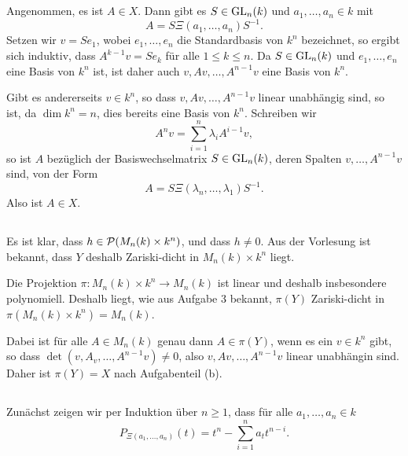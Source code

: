 \documentclass[a4paper,10pt]{article}
\begin{document}
\addtocounter{subsection}{1}
\subsection{}
Angenommen, es ist $A \in X$. Dann gibt es $S \in \operatorname{GL}_n(k)$ und $a_1, \ldots, a_n \in k$ mit
\[
 A = S \Xi(a_1, \ldots, a_n) S^{-1}.
\]
Setzen wir $v = Se_1$, wobei $e_1, \ldots, e_n$ die Standardbasis von $k^n$ bezeichnet, so ergibt sich induktiv, dass $A^{k-1} v = S e_k$ für alle $1 \leq k \leq n$. Da $S \in \operatorname{GL}_n(k)$ und $e_1, \ldots, e_n$ eine Basis von $k^n$ ist, ist daher auch $v, Av, \ldots, A^{n-1}v$ eine Basis von $k^n$.

Gibt es andererseits $v \in k^n$, so dass $v, Av, \ldots, A^{n-1}v$ linear unabhängig sind, so ist, da $\dim k^n = n$, dies bereits eine Basis von $k^n$. Schreiben wir
\[
 A^n v = \sum_{i=1}^n \lambda_i A^{i-1}v,
\]
so ist $A$ bezüglich der Basiswechselmatrix $S \in \operatorname{GL}_n(k)$, deren Spalten $v, \ldots, A^{n-1}v$ sind, von der Form
\[
 A = S \Xi(\lambda_n, \ldots, \lambda_1) S^{-1}.
\]
Also ist $A \in X$.


\subsection{}
Es ist klar, dass $h \in \mathcal{P}(M_n(k) \times k^n)$, und dass $h \neq 0$. Aus der Vorlesung ist bekannt, dass $Y$ deshalb Zariski-dicht in $M_n(k) \times k^n$ liegt.

Die Projektion $\pi : M_n(k) \times k^n \to M_n(k)$ ist linear und deshalb insbesondere polynomiell. Deshalb liegt, wie aus Aufgabe 3 bekannt, $\pi(Y)$ Zariski-dicht in $\pi(M_n(k) \times k^n) = M_n(k)$.

Dabei ist für alle $A \in M_n(k)$ genau dann $A \in \pi(Y)$, wenn es ein $v \in k^n$ gibt, so dass $\det(v, A_v, \ldots, A^{n-1}v) \neq 0$, also $v, Av, \ldots, A^{n-1}v$ linear unabhängin sind. Daher ist $\pi(Y) = X$ nach Aufgabenteil (b).


\subsection{}
Zunächst zeigen wir per Induktion über $n \geq 1$, dass für alle $a_1, \ldots, a_n \in k$
\[
 P_{\Xi(a_1, \ldots, a_n)}(t) = t^n - \sum_{i=1}^n a_t t^{n-i}.
\]
\end{document}
